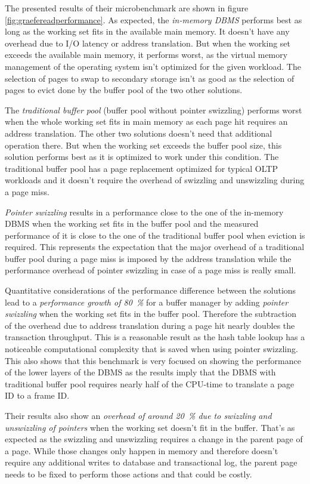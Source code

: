     The presented results of their microbenchmark are shown in figure \ref{fig:graefereadperformance}. As expected, the \emph{in-memory DBMS} performs best as long as the working set fits in the available main memory. It doesn't have any overhead due to I/O latency or address translation. But when the working set exceeds the available main memory, it performs worst, as the virtual memory management of the operating system isn't optimized for the given workload. The selection of pages to swap to secondary storage isn't as good as the selection of pages to evict done by the buffer pool of the two other solutions.

    The \emph{traditional buffer pool} (buffer pool without pointer swizzling) performs worst when the whole working set fits in main memory as each page hit requires an address translation. The other two solutions doesn't need that additional operation there. But when the working set exceeds the buffer pool size, this solution performs best as it is optimized to work under this condition. The traditional buffer pool has a page replacement optimized for typical OLTP workloads and it doesn't require the overhead of swizzling and unswizzling during a page miss.

    \emph{Pointer swizzling} results in a performance close to the one of the in-memory DBMS when the working set fits in the buffer pool and the measured performance of it is close to the one of the traditional buffer pool when eviction is required. This represents the expectation that the major overhead of a traditional buffer pool during a page miss is imposed by the address translation while the performance overhead of pointer swizzling in case of a page miss is really small.

    Quantitative considerations of the performance difference between the solutions lead to a \emph{performance growth of \SI{80}{\percent}} for a buffer manager by adding \emph{pointer swizzling} when the working set fits in the buffer pool. Therefore the subtraction of the overhead due to address translation during a page hit nearly doubles the transaction throughput. This is a reasonable result as the hash table lookup has a noticeable computational complexity that is saved when using pointer swizzling. This also shows that this benchmark is very focused on showing the performance of the lower layers of the DBMS as the results imply that the DBMS with traditional buffer pool requires nearly half of the CPU-time to translate a page ID to a frame ID.

    Their results also show an \emph{overhead of around \SI{20}{\percent} due to swizzling and unswizzling of pointers} when the working set doesn't fit in the buffer. That's as expected as the swizzling and unswizzling requires a change in the parent page of a page. While those changes only happen in memory and therefore doesn't require any additional writes to database and transactional log, the parent page needs to be fixed to perform those actions and that could be costly.


